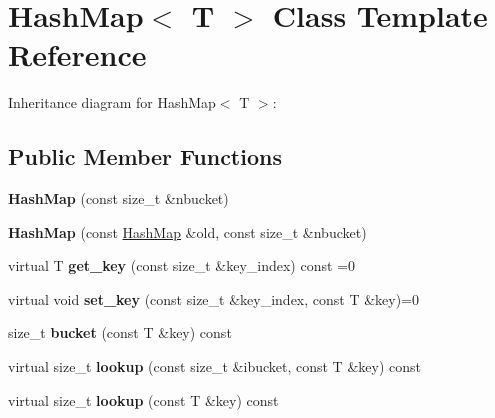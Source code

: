 \hypertarget{classHashMap}{}\section{Hash\+Map$<$ T $>$ Class Template Reference}
\label{classHashMap}


Inheritance diagram for Hash\+Map$<$ T $>$\+:
\subsection*{Public Member Functions}
\begin{DoxyCompactItemize}
\item 
{\bfseries Hash\+Map} (const size\+\_\+t \&nbucket)\hypertarget{classHashMap_ad3da0496d0d5c817818cc3d0de1cde13}{}\label{classHashMap_ad3da0496d0d5c817818cc3d0de1cde13}

\item 
{\bfseries Hash\+Map} (const \hyperlink{classHashMap}{Hash\+Map} \&old, const size\+\_\+t \&nbucket)\hypertarget{classHashMap_ad084f78eb6a7208b9cc67020703ff898}{}\label{classHashMap_ad084f78eb6a7208b9cc67020703ff898}

\item 
virtual T {\bfseries get\+\_\+key} (const size\+\_\+t \&key\+\_\+index) const =0\hypertarget{classHashMap_a6449e282ff3ee559f254f4f727e9cf63}{}\label{classHashMap_a6449e282ff3ee559f254f4f727e9cf63}

\item 
virtual void {\bfseries set\+\_\+key} (const size\+\_\+t \&key\+\_\+index, const T \&key)=0\hypertarget{classHashMap_a21b01a2502b7f45dd939bab7a3811a54}{}\label{classHashMap_a21b01a2502b7f45dd939bab7a3811a54}

\item 
size\+\_\+t {\bfseries bucket} (const T \&key) const \hypertarget{classHashMap_a36df7df6b87258c2817865583569199b}{}\label{classHashMap_a36df7df6b87258c2817865583569199b}

\item 
virtual size\+\_\+t {\bfseries lookup} (const size\+\_\+t \&ibucket, const T \&key) const \hypertarget{classHashMap_a2e14b85d148e08c85f20eabfa978c185}{}\label{classHashMap_a2e14b85d148e08c85f20eabfa978c185}

\item 
virtual size\+\_\+t {\bfseries lookup} (const T \&key) const \hypertarget{classHashMap_ac4ab5ba76fcb4436e9ccdad3c7790567}{}\label{classHashMap_ac4ab5ba76fcb4436e9ccdad3c7790567}


\end{DoxyCompactItemize}
